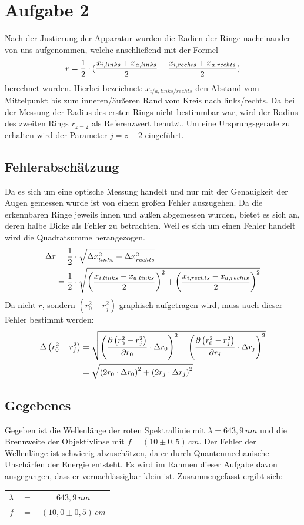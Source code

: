 \section{Aufgabe 2}
Nach der Justierung der Apparatur wurden die Radien der Ringe nacheinander von uns aufgenommen, welche anschließend mit der Formel
\begin{equation}
r=\frac{1}{2}\cdot (\frac{x_{i,links} + x_{a,links}}{2}-\frac{x_{i,rechts} + x_{a,rechts}}{2}) \notag
\end{equation}
berechnet wurden. Hierbei bezeichnet: \(x_{i/a,links/rechts}\) den Abstand vom Mittelpunkt bis zum inneren/äußeren Rand vom Kreis nach links/rechts. Da  bei der Messung der Radius des ersten Rings nicht bestimmbar war, wird der Radius des zweiten Rings \(r_{z=2}\) als Referenzwert benutzt. Um eine Ursprungsgerade zu erhalten wird der Parameter \(j = z - 2\) eingeführt.
\subsection{Fehlerabschätzung}
Da es sich um eine optische Messung handelt und nur mit der Genauigkeit der Augen gemessen wurde ist von einem großen Fehler auszugehen. Da die erkennbaren Ringe jeweils innen und außen abgemessen wurden, bietet es sich an, deren halbe Dicke als Fehler zu betrachten. Weil es sich um einen Fehler handelt wird die Quadratsumme herangezogen.
\begin{align}
\Delta r &= \frac{1}{2} \cdot \sqrt{
\Delta x_{links}^2 +
\Delta x_{rechts}^2
} \notag \\
&= \frac{1}{2} \cdot \sqrt{
\left( \frac{x_{i,links} - x_{a,links}}{2} \right)^2 +
\left( \frac{x_{i,rechts} - x_{a,rechts}}{2} \right)^2
} \notag
\end{align}
Da nicht \(r\), sondern \( \left( r_0^2 - r_j^2 \right) \) graphisch aufgetragen wird, muss auch dieser Fehler bestimmt werden:
\begin{align}
\Delta \left( r_0^2 - r_j^2 \right) &= \sqrt{
\left( \frac{\partial \left( r_0^2 - r_j^2 \right)}{\partial r_0} \cdot \Delta r_0 \right)^2 +
\left( \frac{\partial \left( r_0^2 - r_j^2 \right)}{\partial r_j} \cdot \Delta r_j \right)^2
} \notag \\
 &= \sqrt{
\left( 2 r_0 \cdot \Delta r_0 \right)^2 +
\left( 2 r_j \cdot \Delta r_j \right)^2
} \notag
\end{align}
\subsection{Gegebenes}
Gegeben ist die Wellenlänge der roten Spektrallinie mit \(\lambda = 643,9\,nm\) und die Brennweite der Objektivlinse mit \(f = (10\pm 0,5)\,cm\). Der Fehler der Wellenlänge ist schwierig abzuschätzen, da er durch Quantenmechanische Unschärfen der Energie entsteht. Es wird im Rahmen dieser  Aufgabe davon ausgegangen, dass er vernachlässigbar klein ist. Zusammengefasst ergibt sich:
\begin{center}
\begin{tabular}{rcc}
\(\lambda\) & \(=\) & \(643,9\, nm\) \\
\(f\) & \(=\) & \(\left( 10,0 \pm 0,5 \right)\, cm\) \\
\end{tabular}
\end{center}
